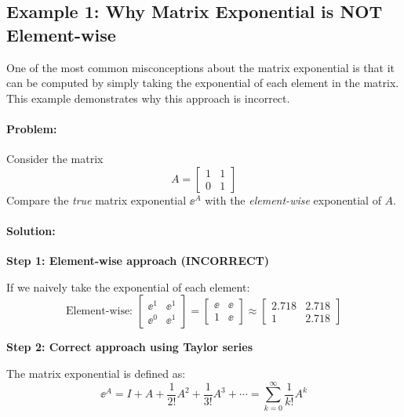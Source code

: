 \documentclass[11pt,a4paper]{article}
\begin{document}
\subsection{Example 1: Why Matrix Exponential is NOT Element-wise}

One of the most common misconceptions about the matrix exponential is that it can be computed by simply taking the exponential of each element in the matrix. This example demonstrates why this approach is incorrect.

\paragraph{Problem:} 
Consider the matrix 
\[
A = \begin{bmatrix} 1 & 1 \\ 0 & 1 \end{bmatrix}
\]
Compare the \emph{true} matrix exponential $\ee^A$ with the \emph{element-wise} exponential of $A$.

\paragraph{Solution:}

\textbf{Step 1: Element-wise approach (INCORRECT)}

If we naively take the exponential of each element:
\[
\text{Element-wise: } \begin{bmatrix} \ee^1 & \ee^1 \\ \ee^0 & \ee^1 \end{bmatrix} = \begin{bmatrix} \ee & \ee \\ 1 & \ee \end{bmatrix} \approx \begin{bmatrix} 2.718 & 2.718 \\ 1 & 2.718 \end{bmatrix}
\]

\textbf{Step 2: Correct approach using Taylor series}

The matrix exponential is defined as:
\[
\ee^A = I + A + \frac{1}{2!}A^2 + \frac{1}{3!}A^3 + \cdots = \sum_{k=0}^{\infty} \frac{1}{k!}A^k
\]
\end{document}
